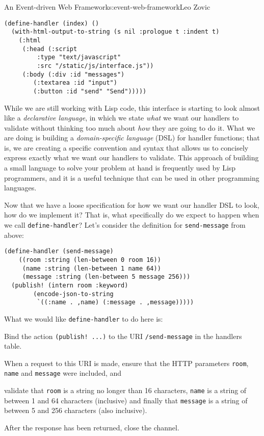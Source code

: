 \begin{aosachapter}{An Event-driven Web Framework}{s:event-web-framework}{Leo Zovic}
\begin{verbatim}
(define-handler (index) ()
  (with-html-output-to-string (s nil :prologue t :indent t)
    (:html
     (:head (:script
         :type "text/javascript"
         :src "/static/js/interface.js"))
     (:body (:div :id "messages")
        (:textarea :id "input")
        (:button :id "send" "Send")))))
\end{verbatim}

While we are still working with Lisp code, this interface is starting to
look almost like a \emph{declarative language}, in which we state
\emph{what} we want our handlers to validate without thinking too much
about \emph{how} they are going to do it. What we are doing is building
a \emph{domain-specific language} (DSL) for handler functions; that is,
we are creating a specific convention and syntax that allows us to
concisely express exactly what we want our handlers to validate. This
approach of building a small language to solve your problem at hand is
frequently used by Lisp programmers, and it is a useful technique that
can be used in other programming languages.

\label{a-dsl-for-handlers}

Now that we have a loose specification for how we want our handler DSL
to look, how do we implement it? That is, what specifically do we expect
to happen when we call \texttt{define-handler}? Let's consider the
definition for \texttt{send-message} from above:

\begin{verbatim}
(define-handler (send-message)
    ((room :string (len-between 0 room 16))
     (name :string (len-between 1 name 64))
     (message :string (len-between 5 message 256)))
  (publish! (intern room :keyword)
        (encode-json-to-string
         `((:name . ,name) (:message . ,message)))))
\end{verbatim}

What we would like \texttt{define-handler} to do here is:

\begin{aosaenumerate}
\def\labelenumi{\arabic{enumi}.}

\item
  Bind the action \texttt{(publish! ...)} to the URI
  \texttt{/send-message} in the handlers table.
\item
  When a request to this URI is made, ensure that the HTTP parameters
  \texttt{room}, \texttt{name} and \texttt{message} were included, and
\item
  validate that \texttt{room} is a string no longer than 16 characters,
  \texttt{name} is a string of between 1 and 64 characters (inclusive)
  and finally that \texttt{message} is a string of between 5 and 256
  characters (also inclusive).
\item
  After the response has been returned, close the channel.
\end{aosaenumerate}


\end{aosachapter}
